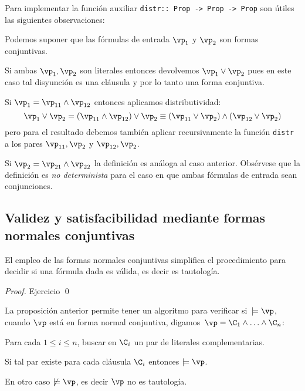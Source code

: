\documentclass[11pt,letterpaper]{article}
\begin{document}
Para implementar la función auxiliar \verb'distr:: Prop -> Prop -> Prop' son 
útiles las siguientes observaciones:
\bi
 \item Podemos suponer que las fórmulas de entrada $\vp_1$ y $\vp_2$ son formas 
  conjuntivas.
 \item Si ambas $\vp_1,\vp_2$ son literales entonces devolvemos 
  $\vp_1\lor\vp_2$ pues en este caso tal disyunción es una cláusula y por lo 
  tanto una forma conjuntiva.
 \item Si $\vp_1=\vp_{11}\land\vp_{12}$ entonces aplicamos distributividad:
  \[
  \vp_1\lor\vp_2=(\vp_{11}\land\vp_{12})\lor\vp_2\equiv 
  (\vp_{11}\lor\vp_2)\land(\vp_{12}\lor\vp_2)
  \]
  pero para el resultado debemos también aplicar recursivamente la función 
  \verb'distr' a los pares $\vp_{11},\vp_2$ y $\vp_{12},\vp_2$.
 \item Si $\vp_2=\vp_{21}\land\vp_{22}$ la definición es análoga al caso 
  anterior.
\ei
Obsérvese que la definición es \textit{no determinista} para el caso en que 
ambas fórmulas de entrada sean conjunciones.


\subsection{Validez y satisfacibilidad mediante formas normales conjuntivas}

El empleo de las formas normales conjuntivas simplifica el procedimiento para
decidir si una fórmula dada es válida, es decir es tautología. 

\begin{proof}
 Ejercicio \qed
\end{proof}

\newpage

La proposición anterior permite tener un algoritmo para verificar 
si~$\models\vp$, cuando $\vp$ está en forma normal conjuntiva, 
digamos~$\vp=\C_1\land\ldots\land\C_n$:
\be
\item Para cada $1\leq i\leq n$, buscar en $\C_i$ un par de literales
  complementarias.
\item Si tal par existe para cada cláusula $\C_i$ entonces $\models\vp$.
\item En otro caso $\not\models\vp$, es decir $\vp$ no es tautología.
\ee
\end{document}
